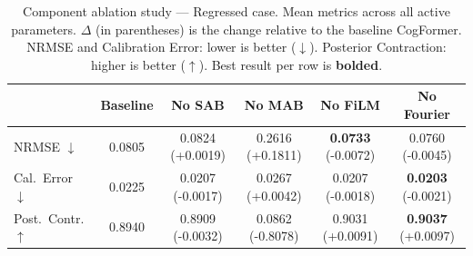 \begin{table}[t]
\centering
\caption{Component ablation study — Regressed case. Mean metrics across
all active parameters. $\Delta$ (in parentheses) is the change relative to the
baseline CogFormer. NRMSE and Calibration Error: lower is better ($\downarrow$).
Posterior Contraction: higher is better ($\uparrow$). Best result per row is
\textbf{bolded}.}
\label{tab:component_ablation_regressed}
\begin{tabular}{lccccc}
\toprule
 & Baseline & No SAB & No MAB & No FiLM & No Fourier \\
\midrule
NRMSE $\downarrow$ & 0.0805 & 0.0824 \small{(+0.0019)} & 0.2616 \small{(+0.1811)} & \textbf{0.0733} \small{(-0.0072)} & 0.0760 \small{(-0.0045)} \\
Cal.\ Error $\downarrow$ & 0.0225 & 0.0207 \small{(-0.0017)} & 0.0267 \small{(+0.0042)} & 0.0207 \small{(-0.0018)} & \textbf{0.0203} \small{(-0.0021)} \\
Post.\ Contr. $\uparrow$ & 0.8940 & 0.8909 \small{(-0.0032)} & 0.0862 \small{(-0.8078)} & 0.9031 \small{(+0.0091)} & \textbf{0.9037} \small{(+0.0097)} \\
\bottomrule
\end{tabular}
\end{table}